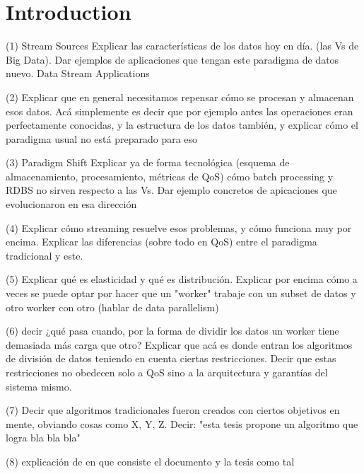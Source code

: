 \chapter{Introduction}
\label{chapter:introduction}

(1) \cite{laney20013d}   Stream Sources  \cite{kamburugamuve2013survey}
Explicar las características de los datos hoy en día. (las Vs de Big Data).
Dar ejemplos de aplicaciones que tengan este paradigma de datos nuevo. Data Stream Applications\cite{chakravarthy2009stream}

(2)
Explicar que en general necesitamos repensar cómo se procesan y almacenan esos datos. Acá simplemente es decir que por ejemplo antes las operaciones eran perfectamente conocidas, y la estructura de los datos también, y explicar cómo el paradigma usual no está preparado para eso

(3) Paradigm Shift\cite{chakravarthy2009stream}
Explicar ya de forma tecnológica (esquema de almacenamiento, procesamiento, métricas de QoS) cómo batch processing y RDBS no sirven respecto a las Vs. Dar ejemplo concretos de apicaciones que evolucionaron en esa dirección

(4)
Explicar cómo streaming resuelve esos problemas, y cómo funciona muy por encima. Explicar las diferencias (sobre todo en QoS) entre el paradigma tradicional y este.

(5)
Explicar qué es elasticidad y qué es distribución. Explicar por encima cómo a veces se puede optar por hacer que un "worker" trabaje con un subset de datos y otro worker con otro (hablar de data parallelism)

(6)
decir ¿qué pasa cuando, por la forma de dividir los datos un worker tiene demasiada más carga que otro? Explicar que acá es donde entran los algoritmos de división de datos teniendo en cuenta ciertas restricciones. Decir que estas restricciones no obedecen solo a QoS sino a la arquitectura y garantías del sistema mismo.

(7)
Decir que algoritmos tradicionales fueron creados con ciertos objetivos en mente, obviando cosas como X, Y, Z. Decir: "esta tesis propone un algoritmo que logra bla bla bla"

(8)
explicación de en que consiste el documento y la tesis como tal
